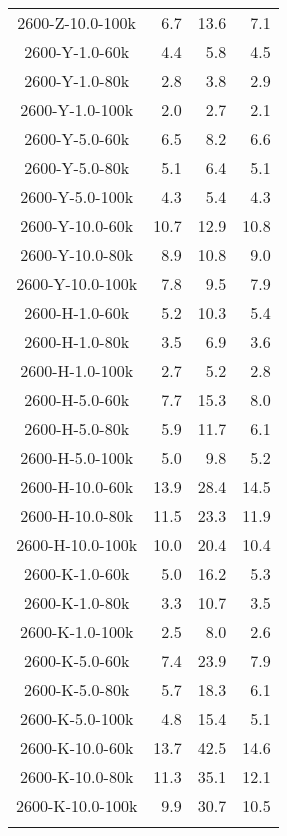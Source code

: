 \begin{longtable}{crrr}
    2600-Z-10.0-100k &    6.7 &   13.6 &    7.1 \\
    2600-Y-1.0-60k   &    4.4 &    5.8 &    4.5 \\
    2600-Y-1.0-80k   &    2.8 &    3.8 &    2.9 \\
    2600-Y-1.0-100k  &    2.0 &    2.7 &    2.1 \\
    2600-Y-5.0-60k   &    6.5 &    8.2 &    6.6 \\
    2600-Y-5.0-80k   &    5.1 &    6.4 &    5.1 \\
    2600-Y-5.0-100k  &    4.3 &    5.4 &    4.3 \\
    2600-Y-10.0-60k  &   10.7 &   12.9 &   10.8 \\
    2600-Y-10.0-80k  &    8.9 &   10.8 &    9.0 \\
    2600-Y-10.0-100k &    7.8 &    9.5 &    7.9 \\
    2600-H-1.0-60k   &    5.2 &   10.3 &    5.4 \\
    2600-H-1.0-80k   &    3.5 &    6.9 &    3.6 \\
    2600-H-1.0-100k  &    2.7 &    5.2 &    2.8 \\
    2600-H-5.0-60k   &    7.7 &   15.3 &    8.0 \\
    2600-H-5.0-80k   &    5.9 &   11.7 &    6.1 \\
    2600-H-5.0-100k  &    5.0 &    9.8 &    5.2 \\
    2600-H-10.0-60k  &   13.9 &   28.4 &   14.5 \\
    2600-H-10.0-80k  &   11.5 &   23.3 &   11.9 \\
    2600-H-10.0-100k &   10.0 &   20.4 &   10.4 \\
    2600-K-1.0-60k   &    5.0 &   16.2 &    5.3 \\
    2600-K-1.0-80k   &    3.3 &   10.7 &    3.5 \\
    2600-K-1.0-100k  &    2.5 &    8.0 &    2.6 \\
    2600-K-5.0-60k   &    7.4 &   23.9 &    7.9 \\
    2600-K-5.0-80k   &    5.7 &   18.3 &    6.1 \\
    2600-K-5.0-100k  &    4.8 &   15.4 &    5.1 \\
    2600-K-10.0-60k  &   13.7 &   42.5 &   14.6 \\
    2600-K-10.0-80k  &   11.3 &   35.1 &   12.1 \\
    2600-K-10.0-100k &    9.9 &   30.7 &   10.5 \\
    \label{tab:spirou_precisions}
\end{longtable}




